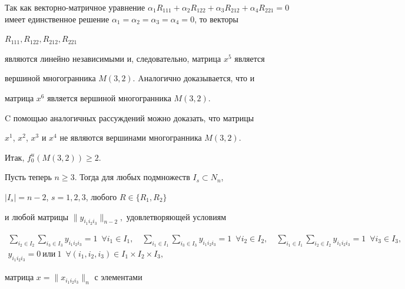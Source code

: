 Так как векторно-матричное уравнение $\alpha_1 R_{111}+\alpha_2 R_{122}+


\alpha_3 R_{212}+\alpha_4 R_{221}=0$ имеет единственное решение $\alpha_1=


\alpha_2=\alpha_3=\alpha_4=0$, то векторы


$R_{111}, R_{122}, R_{212}, R_{221}$


являются линейно независимыми и, следовательно, матрица $x^5$ является


вершиной многогранника $M(3,2)$. Aналогично доказывается, что и


матрица $x^6$ является вершиной многогранника $M(3,2)$.


C помощью аналогичных рассуждений можно доказать, что матрицы


$x^1$, $x^2$, $x^3$ и $x^4$ не являются вершинами многогранника $M(3,2)$.


Итак, $f^u_0(M(3,2))\geq 2$.





Пусть теперь $n\geq 3$. Тогда для любых подмножеств $I_s\subset N_n$,


$|I_s|=n-2$, $s=1,2,3$, любого $R\in \{R_1,R_2\}$


и любой матрицы $\|y_{i_1 i_2 i_3}\|_{n-2},$ удовлетворяющей условиям


\begin{equation}


\begin{array}{c}


\displaystyle\sum_{i_2\in I_2}\sum_{i_3\in I_3}y_{i_1 i_2 i_3}=1


\ \; \forall i_1\in I_1, \quad


\displaystyle\sum_{i_1\in I_1}\sum_{i_3\in I_3}y_{i_1 i_2 i_3}=1


\ \; \forall i_2\in I_2, \quad


\displaystyle\sum_{i_1\in I_1}\sum_{i_2\in I_2}y_{i_1 i_2 i_3}=1


\ \; \forall i_3\in I_3, \\


y_{i_1 i_2 i_3}=0\ \text{или}\ 1\ \; \forall (i_1,i_2,i_3)\in I_1\times I_2


\times I_3,


\end{array}


\end{equation}


матрица $x=\|x_{i_1 i_2 i_3}\|_n$ с элементами


